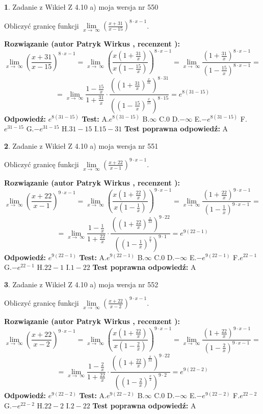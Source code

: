 \documentclass[12pt, a4paper]{article}
\theoremstyle{definition} %
\newtheorem{zad}{}
\newcommand{\zadStart}[1]{\begin{zad}#1\newline}
\newcommand{\zadStop}{\end{zad}}
\newcommand{\rozwStart}[2]{\noindent \textbf{Rozwiązanie (autor #1 , recenzent #2): }\newline}
\newcommand{\rozwStop}{\newline}
\newcommand{\odpStart}{\noindent \textbf{Odpowiedź:}\newline}
\newcommand{\odpStop}{\newline}
\newcommand{\testStart}{\noindent \textbf{Test:}\newline}
\newcommand{\testStop}{\newline}
\newcommand{\kluczStart}{\noindent \textbf{Test poprawna odpowiedź:}\newline}
\newcommand{\kluczStop}{\newline}
\begin{document}
\zadStart{Zadanie z Wikieł Z 4.10 a) moja wersja nr 550}


Obliczyć granicę funkcji  $\lim\limits_{x\to\ \infty}(\frac{x+31}{x-15})^{8\cdot x-1}$.
\zadStop
\rozwStart{Patryk Wirkus}{}
$$\lim\limits_{x\to\ \infty}(\frac{x+31}{x-15})^{8\cdot x-1} = \lim\limits_{x\to\ \infty}(\frac{x(1+\frac{31}{x})}{x(1-\frac{15}{x})})^{8\cdot x-1}=\lim\limits_{x\to\ \infty}\frac{(1+\frac{31}{x})^{8\cdot x-1}}{(1-\frac{15}{x})^{8\cdot x-1}}=$$
$$=\lim\limits_{x\to\ \infty}\frac{1-\frac{15}{x}}{1+\frac{31}{x}}\cdot\frac{((1+\frac{31}{x})^{\frac{x}{31}})^{8\cdot31}}{((1-\frac{15}{x})^{\frac{x}{15}})^{8\cdot15}}=e^{8(31-15)}$$
\rozwStop
\odpStart
$e^{8(31-15)}$
\odpStop
\testStart
A.$e^{8(31-15)}$ B.$\infty$ C.$0$ D.$-\infty$ E.$-e^{8(31-15)}$
F.$e^{31-15}$ G.$-e^{31-15}$
H.$31-15$
I.$15-31$
\testStop
\kluczStart
A
\kluczStop



\zadStart{Zadanie z Wikieł Z 4.10 a) moja wersja nr 551}


Obliczyć granicę funkcji  $\lim\limits_{x\to\ \infty}(\frac{x+22}{x-1})^{9\cdot x-1}$.
\zadStop
\rozwStart{Patryk Wirkus}{}
$$\lim\limits_{x\to\ \infty}(\frac{x+22}{x-1})^{9\cdot x-1} = \lim\limits_{x\to\ \infty}(\frac{x(1+\frac{22}{x})}{x(1-\frac{1}{x})})^{9\cdot x-1}=\lim\limits_{x\to\ \infty}\frac{(1+\frac{22}{x})^{9\cdot x-1}}{(1-\frac{1}{x})^{9\cdot x-1}}=$$
$$=\lim\limits_{x\to\ \infty}\frac{1-\frac{1}{x}}{1+\frac{22}{x}}\cdot\frac{((1+\frac{22}{x})^{\frac{x}{22}})^{9\cdot22}}{((1-\frac{1}{x})^{\frac{x}{1}})^{9\cdot1}}=e^{9(22-1)}$$
\rozwStop
\odpStart
$e^{9(22-1)}$
\odpStop
\testStart
A.$e^{9(22-1)}$ B.$\infty$ C.$0$ D.$-\infty$ E.$-e^{9(22-1)}$
F.$e^{22-1}$ G.$-e^{22-1}$
H.$22-1$
I.$1-22$
\testStop
\kluczStart
A
\kluczStop



\zadStart{Zadanie z Wikieł Z 4.10 a) moja wersja nr 552}


Obliczyć granicę funkcji  $\lim\limits_{x\to\ \infty}(\frac{x+22}{x-2})^{9\cdot x-1}$.
\zadStop
\rozwStart{Patryk Wirkus}{}
$$\lim\limits_{x\to\ \infty}(\frac{x+22}{x-2})^{9\cdot x-1} = \lim\limits_{x\to\ \infty}(\frac{x(1+\frac{22}{x})}{x(1-\frac{2}{x})})^{9\cdot x-1}=\lim\limits_{x\to\ \infty}\frac{(1+\frac{22}{x})^{9\cdot x-1}}{(1-\frac{2}{x})^{9\cdot x-1}}=$$
$$=\lim\limits_{x\to\ \infty}\frac{1-\frac{2}{x}}{1+\frac{22}{x}}\cdot\frac{((1+\frac{22}{x})^{\frac{x}{22}})^{9\cdot22}}{((1-\frac{2}{x})^{\frac{x}{2}})^{9\cdot2}}=e^{9(22-2)}$$
\rozwStop
\odpStart
$e^{9(22-2)}$
\odpStop
\testStart
A.$e^{9(22-2)}$ B.$\infty$ C.$0$ D.$-\infty$ E.$-e^{9(22-2)}$
F.$e^{22-2}$ G.$-e^{22-2}$
H.$22-2$
I.$2-22$
\testStop
\kluczStart
A
\kluczStop
\end{document}
